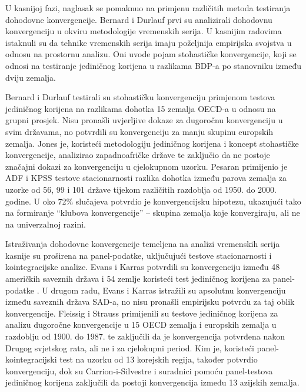 \documentclass{crebsshr}
\begin{document}
    U kasnijoj fazi, naglasak se pomaknuo na primjenu različitih metoda testiranja dohodovne konvergencije. Bernard i Durlauf \citeyearpar{Bernard1991} prvi su analizirali dohodovnu konvergenciju u okviru metodologije vremenskih serija. U kasnijim radovima \citep{Bernard1995, Bernard1996} istaknuli su da tehnike vremenskih serija imaju poželjnija empirijska svojstva u odnosu na prostornu analizu. Oni uvode pojam stohastičke konvergencije, koji se odnosi na testiranje jediničnog korijena u razlikama BDP-a po stanovniku između dviju zemalja.
    
    Bernard i Durlauf \citeyearpar{Bernard1995} testirali su stohastičku konvergenciju primjenom testova jediničnog korijena na razlikama dohotka 15 zemalja OECD-a u odnosu na grupni prosjek. Nisu pronašli uvjerljive dokaze za dugoročnu konvergenciju u svim državama, no potvrdili su konvergenciju za manju skupinu europskih zemalja. Jones \citeyearpar{Jones2002} je, koristeći metodologiju jediničnog korijena i koncept stohastičke konvergencije, analizirao zapadnoafričke države te zaključio da ne postoje značajni dokazi za konvergenciju u cjelokupnom uzorku. Pesaran \citeyearpar{Pesaran2007} primijenio je ADF i KPSS testove stacionarnosti razlika dohotka između parova zemalja za uzorke od 56, 99 i 101 države tijekom različitih razdoblja od 1950. do 2000. godine. U oko 72\% slučajeva potvrdio je konvergencijsku hipotezu, ukazujući tako na formiranje ``klubova konvergencije'' – skupina zemalja koje konvergiraju, ali ne na univerzalnoj razini.
    
    Istraživanja dohodovne konvergencije temeljena na analizi vremenskih serija kasnije su proširena na panel-podatke, uključujući testove stacionarnosti i kointegracijske analize. Evans i Karras \citeyearpar{Evans1996a} potvrdili su konvergenciju između 48 američkih saveznih država i 54 zemlje koristeći test jediničnog korijena za panel-podatke \citep{LevinLin1993}. U drugom radu, Evans i Karras \citeyearpar{Evans1996b} istražili su apsolutnu konvergenciju između saveznih država SAD-a, no nisu pronašli empirijsku potvrdu za taj oblik konvergencije. Fleissig i Strauss \citeyearpar{Fleissig2001} primijenili su testove jediničnog korijena za analizu dugoročne konvergencije u 15 OECD zemalja i europskih zemalja u razdoblju od 1900. do 1987. te zaključili da je konvergencija potvrđena nakon Drugog svjetskog rata, ali ne i za cjelokupni period. Kim \citeyearpar{Kim2005} je, koristeći panel-kointegracijski test na uzorku od 13 korejskih regija, također potvrdio konvergenciju, dok su Carrion-i-Silvestre i suradnici \citeyearpar{Carrion2005} pomoću panel-testova jediničnog korijena zaključili da postoji konvergencija između 13 azijskih zemalja.
    
\end{document}
